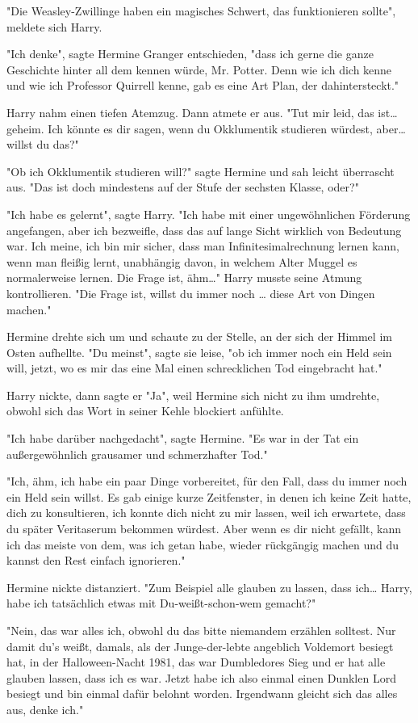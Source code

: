 {"Die Weasley-Zwillinge haben ein magisches Schwert, das funktionieren sollte", meldete sich Harry.

"Ich denke", sagte Hermine Granger entschieden, "dass ich gerne die ganze Geschichte hinter all dem kennen würde, Mr. Potter. Denn wie ich dich kenne und wie ich Professor Quirrell kenne, gab es eine Art Plan, der dahintersteckt."

Harry nahm einen tiefen Atemzug. Dann atmete er aus. "Tut mir leid, das ist… geheim. Ich könnte es dir sagen, wenn du Okklumentik studieren würdest, aber… willst du das?"

"Ob ich Okklumentik studieren will?" sagte Hermine und sah leicht überrascht aus. "Das ist doch mindestens auf der Stufe der sechsten Klasse, oder?"

"Ich habe es gelernt", sagte Harry. "Ich habe mit einer ungewöhnlichen Förderung angefangen, aber ich bezweifle, dass das auf lange Sicht wirklich von Bedeutung war. Ich meine, ich bin mir sicher, dass man Infinitesimalrechnung lernen kann, wenn man fleißig lernt, unabhängig davon, in welchem Alter Muggel es normalerweise lernen. Die Frage ist, ähm…" Harry musste seine Atmung kontrollieren. "Die Frage ist, willst du immer noch … diese Art von Dingen machen."

Hermine drehte sich um und schaute zu der Stelle, an der sich der Himmel im Osten aufhellte. "Du meinst", sagte sie leise, "ob ich immer noch ein Held sein will, jetzt, wo es mir das eine Mal einen schrecklichen Tod eingebracht hat."

Harry nickte, dann sagte er "Ja", weil Hermine sich nicht zu ihm umdrehte, obwohl sich das Wort in seiner Kehle blockiert anfühlte.

"Ich habe darüber nachgedacht", sagte Hermine. "Es war in der Tat ein außergewöhnlich grausamer und schmerzhafter Tod."

"Ich, ähm, ich habe ein paar Dinge vorbereitet, für den Fall, dass du immer noch ein Held sein willst. Es gab einige kurze Zeitfenster, in denen ich keine Zeit hatte, dich zu konsultieren, ich konnte dich nicht zu mir lassen, weil ich erwartete, dass du später Veritaserum bekommen würdest. Aber wenn es dir nicht gefällt, kann ich das meiste von dem, was ich getan habe, wieder rückgängig machen und du kannst den Rest einfach ignorieren."

Hermine nickte distanziert. "Zum Beispiel alle glauben zu lassen, dass ich… Harry, habe ich tatsächlich etwas mit Du-weißt-schon-wem gemacht?"

"Nein, das war alles ich, obwohl du das bitte niemandem erzählen solltest. Nur damit du's weißt, damals, als der Junge-der-lebte angeblich Voldemort besiegt hat, in der Halloween-Nacht 1981, das war Dumbledores Sieg und er hat alle glauben lassen, dass ich es war. Jetzt habe ich also einmal einen Dunklen Lord besiegt und bin einmal dafür belohnt worden. Irgendwann gleicht sich das alles aus, denke ich."

}
